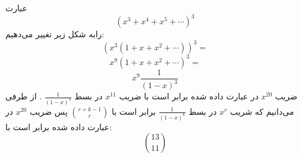         \p
عبارت
$$(x^3 + x^4 + x^5 + \cdots)^3$$
رابه شکل زیر تغییر می‌دهیم:
$$(x^3(1 + x + x^2 + \cdots))^3 =$$
$$x^9(1 + x + x^2 + \cdots)^3 =$$
$$x^9\frac{1}{(1-x)^3}$$
ضریب
$x^{20}$
در عبارت داده شده برابر است با ضریب
$x^{11}$
در بسط
$\frac{1}{(1-x)^3}$
. از طرفی می‌دانیم که شریب
$x^r$
در بسط
$\frac{1}{(1-x)^k}$
برابر است با
$\binom{r+k-1}{r}$
پس ضریب
$x^{20}$
در عبارت داده شده برابر است با:
$$\binom{13}{11}$$
